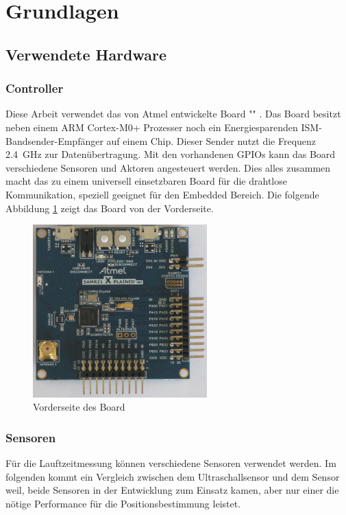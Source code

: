 \newpage
\section{Grundlagen}

\subsection{Verwendete Hardware}
\subsubsection{Controller}
Diese Arbeit verwendet das von Atmel entwickelte Board "\board" \cite{src_SAMR}. Das Board besitzt neben einem ARM Cortex-M0+ Prozesser noch ein Energiesparenden ISM-Bandsender-Empfänger auf einem Chip. Dieser Sender nutzt die Frequenz \SI{2,4}{\giga \hertz} zur Datenübertragung. Mit den vorhandenen GPIOs kann das Board verschiedene Sensoren und Aktoren angesteuert werden. Dies alles zusammen macht das \board \platz zu einem universell einsetzbaren Board für die drahtlose Kommunikation, speziell geeignet für den Embedded Bereich. Die folgende Abbildung \ref{img:samr21} zeigt das \board Board von der Vorderseite.
\begin{figure}[!ht]
	\centering
	\includegraphics[width=0.6\textwidth]{images/samr21.png}
	\caption{Vorderseite des \board Board}
	\label{img:samr21}
\end{figure}

\subsubsection{Sensoren}
Für die Lauftzeitmessung können verschiedene Sensoren verwendet werden. Im folgenden kommt ein Vergleich zwischen dem Ultraschallsensor \ultraschall \platz und dem \microphone \platz Sensor weil, beide Sensoren in der Entwicklung zum Einsatz kamen, aber nur einer die nötige Performance für die Positionsbestimmung leistet.

